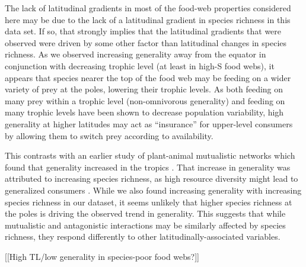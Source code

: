 \documentclass[12pt]{article}
\begin{document}
The lack of latitudinal gradients in most of the food-web properties considered here may be due to the lack of a 
latitudinal gradient in species richness in this data set. If so, that strongly implies that the latitudinal gradients 
that were observed were driven by some other factor than latitudinal changes in species richness. As we observed 
increasing generality away from 
the equator in conjunction with decreasing trophic level (at least in high-S food webs), it appears that species nearer
the top of the food web may be feeding on a wider variety of prey at the poles, lowering their trophic levels. 
As both feeding on many prey within a trophic level (non-omnivorous generality) \citep{Romanuk2006} and feeding on many 
trophic levels \citep{} have been shown to decrease population variability, high generality at higher latitudes may act 
as ``insurance'' for upper-level consumers by allowing them to switch prey according to availability. 


This contrasts with an earlier study of plant-animal mutualistic networks which found that generality increased in the 
tropics \citep{Schleuning2012}. That increase in generality was attributed to increasing species richness, as high 
resource diversity might lead to generalized consumers \citep{Schleuning2012}. While we also found increasing 
generality with increasing species richness in our dataset, it seems unlikely that higher species richness at the poles 
is driving the observed trend in generality. This suggests that while mutualistic and antagonistic interactions may
be similarly affected by species richness, they respond differently to other latitudinally-associated variables.


[[High TL/low generality in species-poor food webs?]]

\end{document}
